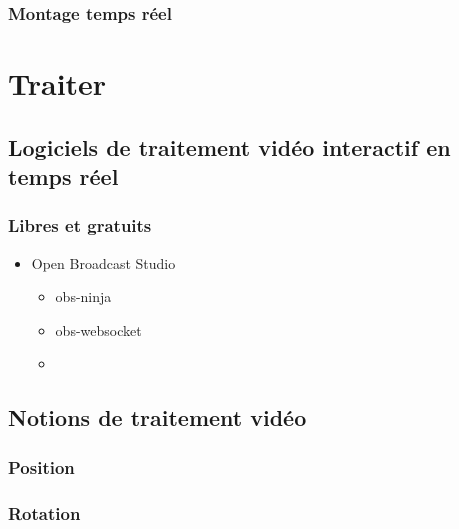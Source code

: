 \documentclass[
]{book}
\providecommand{\tightlist}{%
  \setlength{\itemsep}{0pt}\setlength{\parskip}{0pt}}
\begin{document}
\hypertarget{montage-temps-ruxe9el}{%
\subsection{Montage temps réel}\label{montage-temps-ruxe9el}}

\hypertarget{traiter}{%
\chapter{Traiter}\label{traiter}}

\hypertarget{traiter_logiciels}{%
\section{Logiciels de traitement vidéo interactif en temps réel}\label{traiter_logiciels}}

\hypertarget{libres-et-gratuits}{%
\subsection{Libres et gratuits}\label{libres-et-gratuits}}

\begin{itemize}
\tightlist
\item
  Open Broadcast Studio

  \begin{itemize}
  \tightlist
  \item
    obs-ninja
  \item
    obs-websocket
  \item
  \end{itemize}
\end{itemize}

\hypertarget{notions-de-traitement-viduxe9o}{%
\section{Notions de traitement vidéo}\label{notions-de-traitement-viduxe9o}}

\hypertarget{position-1}{%
\subsection{Position}\label{position-1}}

\hypertarget{rotation}{%
\subsection{Rotation}\label{rotation}}
\end{document}
